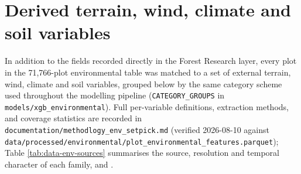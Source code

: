 \section{Derived terrain, wind, climate and soil variables}
\label{sec:data-environmental}

In addition to the fields recorded directly in the Forest Research layer, every plot in the
71,766-plot environmental table was matched to a set of external terrain, wind, climate and soil
variables, grouped below by the same category scheme used throughout the modelling pipeline
(\texttt{CATEGORY\_GROUPS} in \texttt{models/xgb\_environmental}). Full per-variable definitions,
extraction methods, and coverage statistics are recorded in
\texttt{documentation/methodlogy\_env\_setpick.md} (verified 2026-08-10 against
\texttt{data/processed/environmental/plot\_environmental\_features.parquet}); Table
\ref{tab:data-env-sources} summarises the source, resolution and temporal character of each family,
and .

